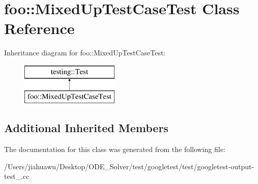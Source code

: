 \hypertarget{classfoo_1_1_mixed_up_test_case_test}{}\section{foo\+:\+:Mixed\+Up\+Test\+Case\+Test Class Reference}
\label{classfoo_1_1_mixed_up_test_case_test}
Inheritance diagram for foo\+:\+:Mixed\+Up\+Test\+Case\+Test\+:\begin{figure}[H]
\begin{center}
\leavevmode
\includegraphics[height=2.000000cm]{classfoo_1_1_mixed_up_test_case_test}
\end{center}
\end{figure}
\subsection*{Additional Inherited Members}


The documentation for this class was generated from the following file\+:\begin{DoxyCompactItemize}
\item 
/\+Users/jiahuawu/\+Desktop/\+O\+D\+E\+\_\+\+Solver/test/googletest/test/googletest-\/output-\/test\+\_\+.\+cc\end{DoxyCompactItemize}
